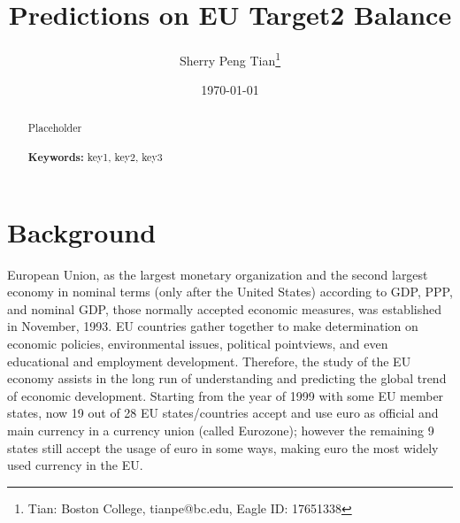 \documentclass[12pt]{article}
\begin{document}
\begin{titlepage}
\title{Predictions on EU Target2 Balance}
\author{Sherry Peng Tian\thanks{Tian: Boston College, tianpe@bc.edu, Eagle ID: 17651338}}
\date{\today}
\maketitle
\begin{abstract}
\noindent Placeholder\\
\vspace{0in}\\
\noindent\textbf{Keywords:} key1, key2, key3\\
\bigskip
\end{abstract}
\setcounter{page}{0}
\thispagestyle{empty}
\end{titlepage}

\pagebreak \newpage

\doublespacing




\section{Background} \label{sec:background}

European Union, as the largest monetary organization and the second largest economy in nominal terms (only after the United States) according to GDP, PPP, and nominal GDP, those normally accepted economic measures, was established in November, 1993. EU countries gather together to make determination on economic policies, environmental issues, political pointviews, and even educational and employment development. Therefore, the study of the EU economy assists in the long run of understanding and predicting the global trend of economic development. Starting from the year of 1999 with some EU member states, now 19 out of 28 EU states/countries accept and use euro as official and main currency in a currency union (called Eurozone); however the remaining 9 states still accept the usage of euro in some ways, making euro the most widely used currency in the EU. 
\end{document}
